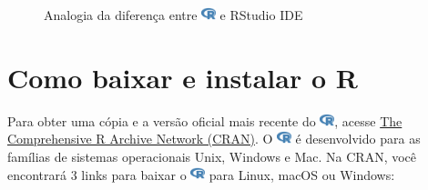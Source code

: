 \documentclass[
  letterpaper,
]{book}
\theoremstyle{definition}
\theoremstyle{plain}
\theoremstyle{remark}
\begin{document}
\begin{figure}
\begin{minipage}{0.49\linewidth}
{}


\end{minipage}%

\caption{\label{fig-r-vs-rstudio-ide-1}Analogia da diferença entre
\includegraphics[width=1.13em,height=1em]{getting_started_with_r_files/figure-pdf/fa-icon-9b00320707d42527dde67262afb33ded.pdf}
e RStudio IDE}

\end{figure}%

\section{Como baixar e instalar o R}\label{como-baixar-e-instalar-o-r}

Para obter uma cópia e a versão oficial mais recente do
\includegraphics[width=1.13em,height=1em]{getting_started_with_r_files/figure-pdf/fa-icon-9b00320707d42527dde67262afb33ded.pdf},
acesse \href{https://cran.r-project.org/}{The Comprehensive R Archive
Network (CRAN)}. O
\includegraphics[width=1.13em,height=1em]{getting_started_with_r_files/figure-pdf/fa-icon-9b00320707d42527dde67262afb33ded.pdf}
é desenvolvido para as famílias de sistemas operacionais Unix, Windows e
Mac. Na CRAN, você encontrará 3 links para baixar o
\includegraphics[width=1.13em,height=1em]{getting_started_with_r_files/figure-pdf/fa-icon-9b00320707d42527dde67262afb33ded.pdf}
para Linux, macOS ou Windows:
\end{document}
